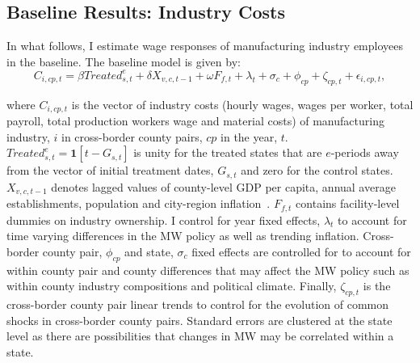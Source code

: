 \documentclass[12pt, english]{article}
\begin{document}
    \subsection{Baseline Results: Industry Costs}\label{subsec:baseline-results-industry-costs}
    In what follows, I estimate wage responses of manufacturing industry employees in the baseline. The baseline model is given by:
    \begin{equation}
        C_{i,cp,t} = \beta Treated_{s,t}^e + \delta X_{v,c,t-1} + \omega F_{f,t} + \lambda_{t} + \sigma_{c} + \phi_{cp} + \zeta_{cp,t} + \epsilon_{i,cp,t},\label{eq:baseline-wages}
    \end{equation}
    

    where $C_{i,cp,t}$ is the vector of industry costs (hourly wages, wages per worker, total payroll, total production workers wage and material costs) of manufacturing industry, $i$ in cross-border county pairs, $cp$ in the year, $t$. $Treated_{s,t}^e = \textbf{1}[t - G_{s,t}]$ is unity for the treated states that are $e$-periods away from the vector of initial treatment dates, $G_{s,t}$ and zero for the control states. $X_{v,c,t-1}$ denotes lagged values of county-level GDP per capita, annual average establishments, population and city-region inflation~\parencite{gopalan2021state, dube2010minimum, clemens2019making}. $F_{f,t}$ contains facility-level dummies on industry ownership. I control for year fixed effects, $\lambda_{t}$ to account for time varying differences in the MW policy as well as trending inflation. Cross-border county pair, $\phi_{cp}$ and state, $\sigma_{c}$ fixed effects are controlled for to account for within county pair and county differences that may affect the MW policy such as within county industry compositions and political climate. Finally, $\zeta_{cp,t}$ is the cross-border county pair linear trends to control for the evolution of common shocks in cross-border county pairs. Standard errors are clustered at the state level as there are possibilities that changes in MW may be correlated within a state.
\end{document}
